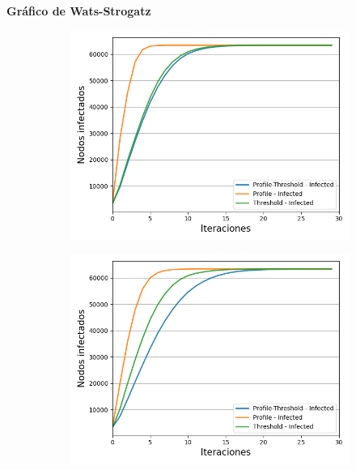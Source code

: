 \documentclass{article}
\begin{document}
\textbf{Gráfico de Wats-Strogatz}
\begin{figure}[!tbp]
	\begin{subfigure}[b]{0.5\textwidth}
		\includegraphics[width=\textwidth, height=\textwidth]{../Images/Fig 3 a).png}
		\caption{}
		\label{fig:f31}
	\end{subfigure}
	\hfill
	\begin{subfigure}[b]{0.5\textwidth}
		\includegraphics[width=\textwidth, height=\textwidth]{../Images/Fig 3 b).png}

\end{subfigure}
\end{figure}
\end{document}
